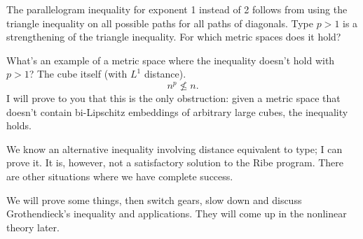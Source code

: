 The parallelogram inequality for exponent 1 instead of 2 follows from using the triangle inequality on all possible paths for all paths of diagonals. Type $p>1$ is a strengthening of the triangle inequality. For which metric spaces does it hold?

What's an example of a metric space where the inequality doesn't hold with $p>1$? The cube itself (with $L^1$ distance).
\[
n^p\nleq n.
\]
I will prove to you that this is the only obstruction: given a metric space that doesn't contain bi-Lipschitz embeddings of arbitrary large cubes, the inequality holds. 

We know an alternative inequality involving distance equivalent to type; I can prove it. It is, however, not a satisfactory solution to the Ribe program. There are other situations where we have complete success.

We will prove some things, then switch gears, slow down and discuss Grothendieck's inequality and applications. They will come up in the nonlinear theory later.